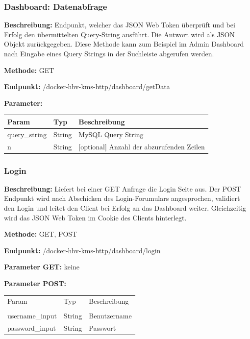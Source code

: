 \subsubsection{Dashboard: Datenabfrage}
\label{sec:routes-dashboard-query}
\textbf{Beschreibung:} Endpunkt, welcher das JSON Web Token überprüft und bei Erfolg den übermittelten
Query-String ausführt. Die Antwort wird als JSON Objekt zurückgegeben. Diese Methode kann zum Beispiel im Admin Dashboard
nach Eingabe eines Query Strings in der Suchleiste abgerufen werden.

\textbf{Methode:} GET

\textbf{Endpunkt:} /docker-hbv-kms-http/dashboard/getData

\textbf{Parameter:}
\begin{table}[H]
    \label{table:/docker-hbv-kms-http/getData}
    \setlength{\tabcolsep}{3pt}
    \begin{tabular}{p{100pt}p{80pt}p{200pt}}
        \hline
        Param         & Typ    & Beschreibung                              \\
        \hline
        query\_string & String & MySQL Query String                        \\
        n             & String & [optional] Anzahl der abzurufenden Zeilen \\
        \hline
    \end{tabular}
\end{table}
\dotfill

\subsubsection{Login}
\label{sec:routes-login}
\textbf{Beschreibung:} Liefert bei einer GET Anfrage die Login Seite aus. Der POST Endpunkt wird
nach Abschicken des Login-Forumulars angesprochen, validiert den Login und leitet den Client bei
Erfolg an das Dashboard weiter. Gleichzeitig wird das JSON Web Token im Cookie des Clients hinterlegt.

\textbf{Methode:} GET, POST

\textbf{Endpunkt:} /docker-hbv-kms-http/dashboard/login

\textbf{Parameter GET:} keine

\textbf{Parameter POST:}
\begin{table}[H]
    \label{table:/docker-hbv-kms-http/login}
    \setlength{\tabcolsep}{3pt}
    \begin{tabular}{p{100pt}p{80pt}p{200pt}}
        \hline
        Param           & Typ    & Beschreibung \\                                                             \\
        \hline
        username\_input & String & Benutzername \\
        password\_input & String & Passwort     \\
        \hline
    \end{tabular}
\end{table}
\dotfill

